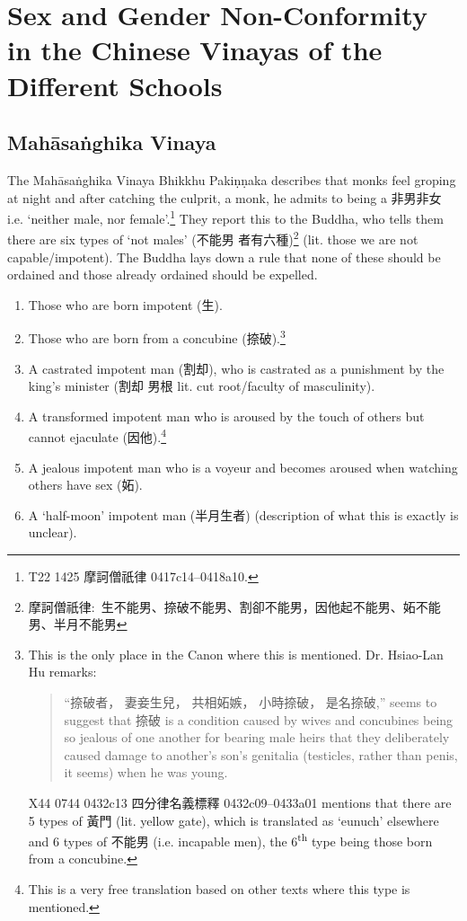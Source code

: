 \section{Sex and Gender Non-Conformity in the Chinese Vinayas of the Different Schools}
\label{appendix1}

\subsection{Mahāsaṅghika Vinaya}
The Mahāsaṅghika Vinaya Bhikkhu Pakiṇṇaka describes that monks feel groping at night and after catching the culprit, a monk, he admits to being a 非男非女 i.e. `neither male, nor female'.\footnote{T22 1425 摩訶僧祇律 0417c14–0418a10.} They report this to the Buddha, who tells them there are six types of `not males' (不能男 者有六種)\footnote{摩訶僧祇律: 生不能男、捺破不能男、割卻不能男，因他起不能男、妬不能男、半月不能男} (lit. those we are not capable/impotent). The Buddha lays down a rule that none of these should be ordained and those already ordained should be expelled.

\begin{enumerate}
\item Those who are born impotent (生). 
\item Those who are born from a concubine (捺破).\footnote{This is the only place in the Canon where this is mentioned. Dr. Hsiao-Lan Hu remarks: 
\begin{quote}
``捺破者， 妻妾生兒， 共相妬嫉， 小時捺破， 是名捺破,'' seems to suggest that 捺破 is a condition caused by wives and concubines being so jealous of one another for bearing male heirs that they deliberately caused damage to another's son's genitalia (testicles, rather than penis, it seems) when he was young.  
\end{quote}
X44 0744 0432c13 四分律名義標釋 0432c09–0433a01 mentions that there are 5 types of 黃門 (lit. yellow gate), which is translated as `eunuch' elsewhere and 6 types of 不能男 (i.e. incapable men), the 6\textsuperscript{th} type being those born from a concubine.}
\item A castrated impotent man (割却), who is castrated as a punishment by the king's minister (割却 男根 lit. cut root/faculty of masculinity).
\item A transformed impotent man who is aroused by the touch of others but cannot ejaculate (因他).\footnote{This is a very free translation based on other texts where this type is mentioned.}
\item A jealous impotent man who is a voyeur and becomes aroused when watching others have sex (妬).
\item A `half-moon' impotent man (半月生者) (description of what this is exactly is unclear).
\end{enumerate}

